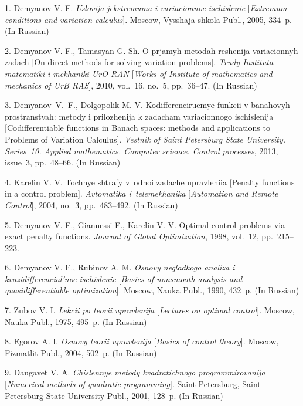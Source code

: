 

{\footnotesize

\vskip 4mm


\vskip 3mm

1. {Demyanov V. F.} {\it Uslovija jekstremuma i variacionnoe
ischislenie} [{\it Extremum conditions and variation calculus}].
Moscow, Vysshaja shkola Publ., 2005, 334~p. (In Russian)

2. {Demyanov V. F., Tamasyan G. Sh.} O prjamyh metodah reshenija
variacionnyh zadach [On direct methods for solving variation
problems]. \textit{Trudy Instituta matematiki i mekhaniki UrO RAN}
[{\it Works of Institute of mathematics and mechanics of UrB
RAS}], 2010, vol.~16, no.~5, pp.~36--47. (In Russian)

3. Demyanov~V.~F., Dolgopolik M. V. Kodifferenciruemye funkcii v
banahovyh prostranstvah: metody i prilozhenija k zadacham
variacionnogo ischislenija [Codifferentiable functions in Banach
spaces: methods and applications to Problems of Variation
Calculus]. \textit{Vestnik of Saint Petersburg State University.
Series~10. Applied mathematics. Computer science. Control
processes}, 2013, issue~3, pp.~48--66. (In Russian)

4. Karelin V. V. Tochnye shtrafy v~odnoi zadache upravleniia
[Penalty functions in a control problem].  \textit{Avtomatika
i~telemekhanika}  [\textit{Automation and Remote Control}], 2004,
no.~3, pp.~483--492. (In Russian)

5. Demyanov V. F., Giannessi F., Karelin V. V. Optimal control
problems via exact penalty functions. \textit{Journal of Global
Optimization}, 1998, vol.~12, pp.~215--223.

6. Demyanov V. F., Rubinov A. M. {\it Osnovy negladkogo analiza i
kvazidifferencial'noe ischislenie} [{\it Basics of nonsmooth
analysis and quasidifferentiable optimization}]. Moscow, Nauka
Publ., 1990, 432~p. (In Russian)

7. Zubov V. I. {\it Lekcii po teorii upravlenija} [{\it Lectures
on optimal control}]. Moscow, Nauka Publ., 1975, 495~p. (In
Russian)

8. Egorov A. I. {\it Osnovy teorii upravlenija} [{\it Basics of
control theory}]. Moscow, Fizmatlit Publ., 2004, 502~p. (In
Russian)

9. Daugavet V. A. {\it Chislennye metody kvadratichnogo
programmirovanija} [{\it Numerical methods of quadratic
programming}]. Saint Petersburg, Saint Petersburg State University
Publ., 2001, 128~p. (In Russian)

}

